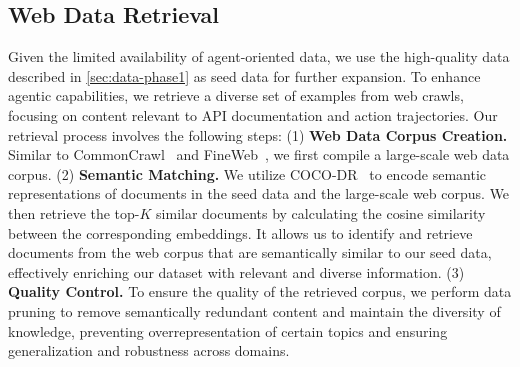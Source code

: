 \subsection{Web Data Retrieval}
\label{sec:data-phase2}
Given the limited availability of agent-oriented data, we use the high-quality data described in \cref{sec:data-phase1} as seed data for further expansion. To enhance agentic capabilities, we retrieve a diverse set of examples from web crawls, focusing on content relevant to API documentation and action trajectories.
Our retrieval process involves the following steps:
(1) \textbf{Web Data Corpus Creation.} Similar to CommonCrawl~\cite{raffel2020exploring} and FineWeb~\citep{penedo2024finewebdatasetsdecantingweb}, we first compile a large-scale web data corpus.
(2) \textbf{Semantic Matching.} We utilize COCO-DR~\cite{yu2022coco} to encode semantic representations of documents in the seed data and the large-scale web corpus. 
We then retrieve the top-$K$ similar documents by calculating the cosine similarity between the corresponding embeddings. 
It allows us to identify and retrieve documents from the web corpus that are semantically similar to our seed data, effectively enriching our dataset with relevant and diverse information.
(3) \textbf{Quality Control.} To ensure the quality of the retrieved corpus, we perform data pruning to remove semantically redundant content and maintain the diversity of knowledge, preventing overrepresentation of certain topics and ensuring generalization and robustness across domains.


